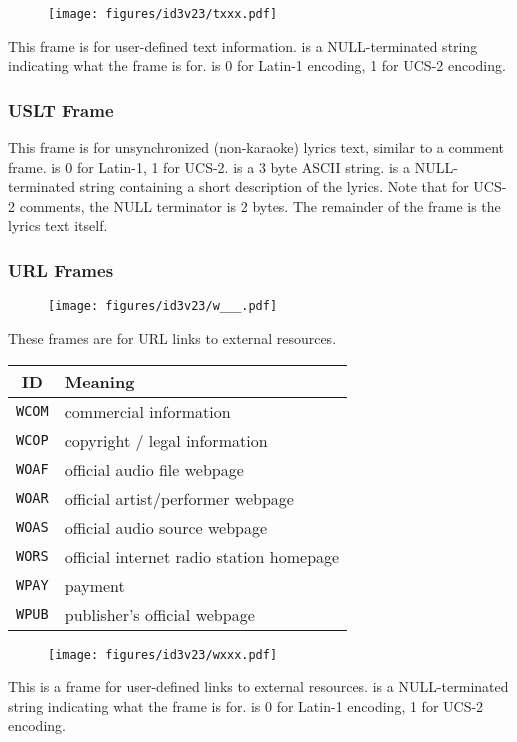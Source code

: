 \begin{figure}[h]
\texttt{[image: figures/id3v23/txxx.pdf]}
\end{figure}
This frame is for user-defined text information.
 is a NULL-terminated string indicating
what the frame is for.
 is 0 for Latin-1 encoding, 1 for UCS-2 encoding.

\clearpage

\subsubsection{USLT Frame}
This frame is for unsynchronized (non-karaoke) lyrics text,
similar to a comment frame.
 is 0 for Latin-1, 1 for UCS-2.
 is a 3 byte ASCII string.
 is a NULL-terminated string
containing a short description of the lyrics.
Note that for UCS-2 comments, the NULL terminator is 2 bytes.
The remainder of the frame is the lyrics text itself.

\subsubsection{URL Frames}
\begin{figure}[h]
\texttt{[image: figures/id3v23/w\_\_\_.pdf]}
\end{figure}
These frames are for URL links to external resources.
\par
\begin{table}[h]
\begin{tabular}{|c|l|}
\hline
ID & Meaning \\
\hline
\texttt{WCOM} & commercial information \\
\texttt{WCOP} & copyright / legal information \\
\texttt{WOAF} & official audio file webpage \\
\texttt{WOAR} & official artist/performer webpage \\
\texttt{WOAS} & official audio source webpage \\
\texttt{WORS} & official internet radio station homepage \\
\texttt{WPAY} & payment \\
\texttt{WPUB} & publisher's official webpage \\
\hline
\end{tabular}
\end{table}
\begin{figure}[h]
\texttt{[image: figures/id3v23/wxxx.pdf]}
\end{figure}
This is a frame for user-defined links to external resources.
 is a NULL-terminated string indicating
what the frame is for.
 is 0 for Latin-1 encoding, 1 for UCS-2 encoding.

